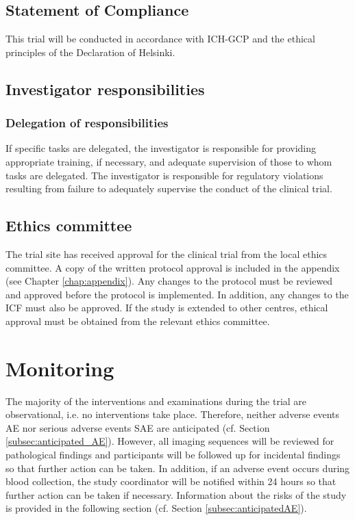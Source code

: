 \subsection{Statement of Compliance}
This trial will be conducted in accordance with ICH-GCP and the ethical principles of the Declaration of Helsinki.

\subsection{Investigator responsibilities}

\subsubsection{Delegation of responsibilities}
If specific tasks are delegated, the investigator is responsible for providing appropriate training, if necessary, and adequate supervision of those to whom tasks are delegated. The investigator is responsible for regulatory violations resulting from failure to adequately supervise the conduct of the clinical trial.

\subsection{Ethics committee}
The trial site has received approval for the clinical trial from the local ethics committee. A copy of the written protocol approval is included in the appendix (see Chapter \ref{chap:appendix}). Any changes to the protocol must be reviewed and approved before the protocol is implemented. In addition, any changes to the \ac{ICF} must also be approved. If the study is extended to other centres, ethical approval must be obtained from the relevant ethics committee.

\section{Monitoring}
The majority of the interventions and examinations during the trial are observational, i.e. no interventions take place. Therefore, neither adverse events \ac{AE} nor serious adverse events \ac{SAE} are anticipated (cf. Section \ref{subsec:anticipated_AE}). However, all imaging sequences will be reviewed for pathological findings and participants will be followed up for incidental findings so that further action can be taken. In addition, if an adverse event occurs during blood collection, the study coordinator will be notified within 24 hours so that further action can be taken if necessary. Information about the risks of the study is provided in the following section (cf. Section \ref{subsec:anticipatedAE}).

